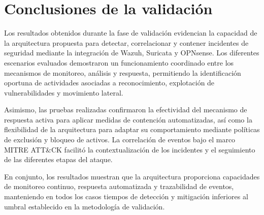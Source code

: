 \section{Conclusiones de la validación}
\noindent

Los resultados obtenidos durante la fase de validación evidencian la capacidad de la arquitectura propuesta para detectar, 
correlacionar y contener incidentes de seguridad mediante la integración de Wazuh, Suricata y OPNsense. Los diferentes 
escenarios evaluados demostraron un funcionamiento coordinado entre los mecanismos de monitoreo, análisis y respuesta, 
permitiendo la identificación oportuna de actividades asociadas a reconocimiento, explotación de vulnerabilidades y 
movimiento lateral.

Asimismo, las pruebas realizadas confirmaron la efectividad del mecanismo de respuesta activa para aplicar medidas de 
contención automatizadas, así como la flexibilidad de la arquitectura para adaptar su comportamiento mediante políticas de 
exclusión y bloqueo de activos. La correlación de eventos bajo el marco MITRE ATT\&CK facilitó la contextualización de los 
incidentes y el seguimiento de las diferentes etapas del ataque.

En conjunto, los resultados muestran que la arquitectura proporciona capacidades de monitoreo continuo, respuesta 
automatizada y trazabilidad de eventos, manteniendo en todos los casos tiempos de detección y mitigación inferiores al 
umbral establecido en la metodología de validación.

